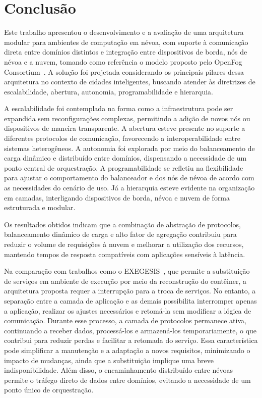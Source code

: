 \chapter{Conclusão}\label{cap:conclusao}

Este trabalho apresentou o desenvolvimento e a avaliação de uma arquitetura modular para ambientes de computação em névoa, com suporte à comunicação direta entre domínios distintos e integração entre dispositivos de borda, nós de névoa e a nuvem, tomando como referência o modelo proposto pelo OpenFog Consortium~\cite{openfog2018}. A solução foi projetada considerando os principais pilares dessa arquitetura no contexto de cidades inteligentes, buscando atender às diretrizes de escalabilidade, abertura, autonomia, programabilidade e hierarquia.

A escalabilidade foi contemplada na forma como a infraestrutura pode ser expandida sem reconfigurações complexas, permitindo a adição de novos nós ou dispositivos de maneira transparente. A abertura esteve presente no suporte a diferentes protocolos de comunicação, favorecendo a interoperabilidade entre sistemas heterogêneos. A autonomia foi explorada por meio do balanceamento de carga dinâmico e distribuído entre domínios, dispensando a necessidade de um ponto central de orquestração. A programabilidade se refletiu na flexibilidade para ajustar o comportamento do balanceador e dos nós de névoa de acordo com as necessidades do cenário de uso. Já a hierarquia esteve evidente na organização em camadas, interligando dispositivos de borda, névoa e nuvem de forma estruturada e modular.

Os resultados obtidos indicam que a combinação de abstração de protocolos, balanceamento dinâmico de carga e alto fator de agregação contribuiu para reduzir o volume de requisições à nuvem e melhorar a utilização dos recursos, mantendo tempos de resposta compatíveis com aplicações sensíveis à latência.

Na comparação com trabalhos como o EXEGESIS~\cite{exegesis2021}, que permite a substituição de serviços em ambiente de execução por meio da reconstrução do contêiner, a arquitetura proposta requer a interrupção para a troca de serviços. No entanto, a separação entre a camada de aplicação e as demais possibilita interromper apenas a aplicação, realizar os ajustes necessários e retomá-la sem modificar a lógica de comunicação. Durante esse processo, a camada de protocolos permanece ativa, continuando a receber dados, processá-los e armazená-los temporariamente, o que contribui para reduzir perdas e facilitar a retomada do serviço. Essa característica pode simplificar a manutenção e a adaptação a novos requisitos, minimizando o impacto de mudanças, ainda que a substituição implique uma breve indisponibilidade. Além disso, o encaminhamento distribuído entre névoas permite o tráfego direto de dados entre domínios, evitando a necessidade de um ponto único de orquestração.

